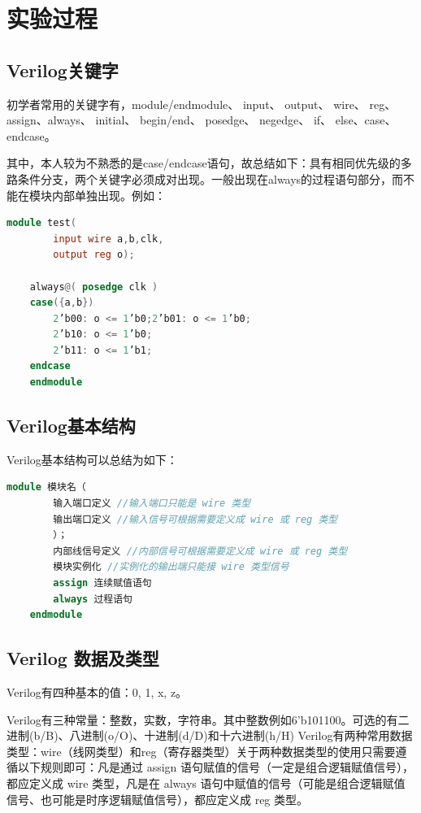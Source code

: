 \documentclass[UTF8]{article}
\begin{document}
	\section{实验过程}
	\subsection{Verilog关键字}
	初学者常用的关键字有，module/endmodule、 input、 output、 wire、 reg、assign、always、 initial、 begin/end、 posedge、 negedge、 if、 else、case、 endcase。\par
	其中，本人较为不熟悉的是case/endcase语句，故总结如下：具有相同优先级的多路条件分支，两个关键字必须成对出现。一般出现在always的过程语句部分，而不能在模块内部单独出现。例如：\par
	\begin{lstlisting}[language=Verilog]
	module test(
		input wire a,b,clk,
		output reg o);
		
	always@( posedge clk )
	case({a,b})
		2’b00: o <= 1’b0;2’b01: o <= 1’b0;
		2’b10: o <= 1’b0;
		2’b11: o <= 1’b1;
	endcase
	endmodule
	\end{lstlisting}
	
	\subsection{Verilog基本结构}
	Verilog基本结构可以总结为如下：
	\begin{lstlisting}[language=Verilog]
	module 模块名（
		输入端口定义 //输入端口只能是 wire 类型
		输出端口定义 //输入信号可根据需要定义成 wire 或 reg 类型
		）；
		内部线信号定义 //内部信号可根据需要定义成 wire 或 reg 类型
		模块实例化 //实例化的输出端只能接 wire 类型信号
		assign 连续赋值语句
		always 过程语句
	endmodule
	\end{lstlisting}
	
	\subsection{Verilog 数据及类型}
	Verilog有四种基本的值：0, 1, x, z。\par
	Verilog有三种常量：整数，实数，字符串。其中整数例如6'b101100。可选的有二进制(b/B)、八进制(o/O)、十进制(d/D)和十六进制(h/H)
	Verilog有两种常用数据类型：wire（线网类型）和reg（寄存器类型）关于两种数据类型的使用只需要遵循以下规则即可：凡是通过 assign 语句赋值的信号（一定是组合逻辑赋值信号），都应定义成 wire 类型，凡是在 always 语句中赋值的信号（可能是组合逻辑赋值信号、也可能是时序逻辑赋值信号），都应定义成 reg 类型。
	
\end{document}
